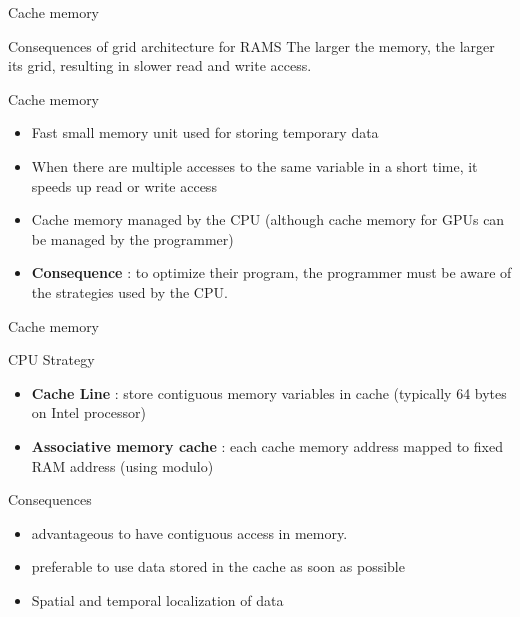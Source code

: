 \documentclass[compress,10pt,aspectratio=169]{beamer}
\begin{document}
\begin{frame}[fragile]{Cache memory}
    \begin{block}{Consequences of grid architecture for RAMS}
        The larger the memory, the larger its grid, resulting in slower read and write access.
    \end{block}

    \begin{exampleblock}{Cache memory}
        \begin{itemize}
            \item Fast small memory unit used for storing temporary data
            \item When there are multiple accesses to the same variable \alert{in a short time}, it speeds up read or write access
            \item Cache memory managed by the CPU (although cache memory for GPUs can be managed by the programmer)
            \item \textbf{Consequence} : to optimize their program, the programmer must be aware of the strategies used by the CPU.
        \end{itemize}
    \end{exampleblock}
\end{frame}


\begin{frame}[fragile]{Cache memory}
    \begin{block}{CPU Strategy}
        \begin{itemize}
            \item \textbf{Cache Line} : store contiguous memory variables in cache (typically 64 bytes on Intel processor)
            \item \textbf{Associative memory cache} : each cache memory address mapped to fixed RAM address (using modulo)
        \end{itemize}
    \end{block}

    \begin{alertblock}{Consequences}
        \begin{itemize}
            \item advantageous to have contiguous access in memory.
            \item preferable to use data stored in the cache as soon as possible
            \item \alert{Spatial and temporal localization of data}
        \end{itemize}
    \end{alertblock}
\end{frame}
\end{document}
